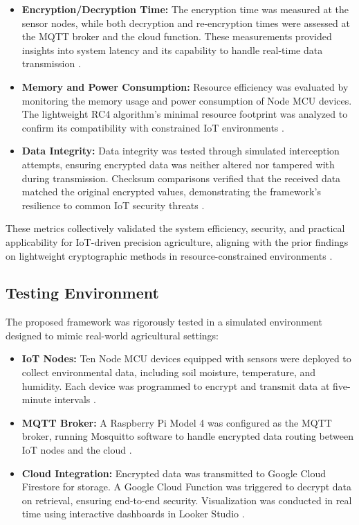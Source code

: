 \documentclass[journal]{Definitions/mdpi}
\begin{document}
\begin{itemize}
    \item \textbf{Encryption/Decryption Time:} The encryption time was measured at the sensor nodes, while both decryption and re-encryption times were assessed at the MQTT broker and the cloud function. These measurements provided insights into system latency and its capability to handle real-time data transmission \cite{ref-journal2, ref-cloud3}.
    \item \textbf{Memory and Power Consumption:} Resource efficiency was evaluated by monitoring the memory usage and power consumption of Node MCU devices. The lightweight RC4 algorithm's minimal resource footprint was analyzed to confirm its compatibility with constrained IoT environments \cite{ref-standards1, ref-journal6}.
    \item \textbf{Data Integrity:} Data integrity was tested through simulated interception attempts, ensuring encrypted data was neither altered nor tampered with during transmission. Checksum comparisons verified that the received data matched the original encrypted values, demonstrating the framework's resilience to common IoT security threats \cite{ref-journal7, ref-conference4}.
\end{itemize}

These metrics collectively validated the system efficiency, security, and practical applicability for IoT-driven precision agriculture, aligning with the prior findings on lightweight cryptographic methods in resource-constrained environments \cite{ref-journal2, ref-journal6, ref-journal7}.

\subsection{Testing Environment}

The proposed framework was rigorously tested in a simulated environment designed to mimic real-world agricultural settings:

\begin{itemize}
    \item \textbf{IoT Nodes:} Ten Node MCU devices equipped with sensors were deployed to collect environmental data, including soil moisture, temperature, and humidity. Each device was programmed to encrypt and transmit data at five-minute intervals \cite{ref-journal2, ref-journal6}.
    \item \textbf{MQTT Broker:} A Raspberry Pi Model 4 was configured as the MQTT broker, running Mosquitto software to handle encrypted data routing between IoT nodes and the cloud \cite{ref-cloud3}.
    \item \textbf{Cloud Integration:} Encrypted data was transmitted to Google Cloud Firestore for storage. A Google Cloud Function was triggered to decrypt data on retrieval, ensuring end-to-end security. Visualization was conducted in real time using interactive dashboards in Looker Studio \cite{ref-cloud1, ref-cloud2}.
\end{itemize}
\end{document}
